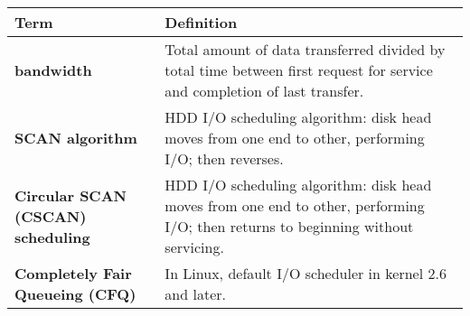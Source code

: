 \vspace{1em}
\begin{tabular}{p{}p{}}
\toprule
\rowcolor{lightgray} \textbf{Term} & \textbf{Definition} \\
\midrule
\textbf{bandwidth} & Total amount of data transferred divided by total time between first request for service and completion of last transfer. \\
\textbf{SCAN algorithm} & HDD I/O scheduling algorithm: disk head moves from one end to other, performing I/O; then reverses. \\
\textbf{Circular SCAN (CSCAN) scheduling} & HDD I/O scheduling algorithm: disk head moves from one end to other, performing I/O; then returns to beginning without servicing. \\
\textbf{Completely Fair Queueing (CFQ)} & In Linux, default I/O scheduler in kernel 2.6 and later. \\
\bottomrule
\end{tabular}
